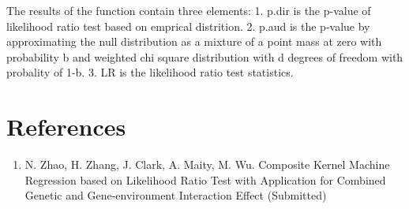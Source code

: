 \documentclass[11pt,]{article}
\providecommand{\tightlist}{%
\setlength{\itemsep}{0pt}\setlength{\parskip}{0pt}}
\begin{document}
The results of the function contain three elements: 1. p.dir is the
p-value of likelihood ratio test based on emprical distrition. 2. p.aud
is the p-value by approximating the null distribution as a mixture of a
point mass at zero with probability b and weighted chi square
distribution with d degrees of freedom with probality of 1-b. 3. LR is
the likelihood ratio test statistics.

\section{References}\label{references}

\begin{enumerate}
\def\labelenumi{\arabic{enumi}.}
\tightlist
\item
  N. Zhao, H. Zhang, J. Clark, A. Maity, M. Wu. Composite Kernel Machine
  Regression based on Likelihood Ratio Test with Application for
  Combined Genetic and Gene-environment Interaction Effect (Submitted)
\end{enumerate}




\newpage
\singlespacing 
\end{document}
